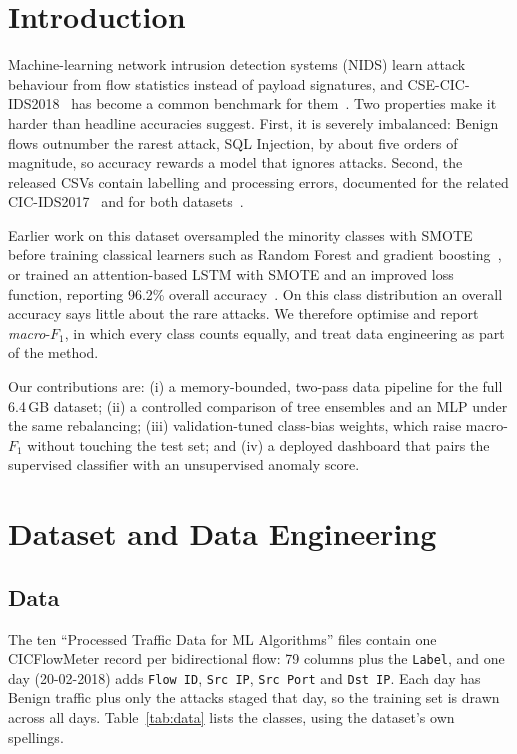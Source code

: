 \documentclass[conference]{IEEEtran}
\begin{document}
\section{Introduction}
Machine-learning network intrusion detection systems (NIDS) learn attack
behaviour from flow statistics instead of payload signatures, and
CSE-CIC-IDS2018~\cite{sharafaldin2018} has become a common benchmark for
them~\cite{leevy2020}. Two properties make it harder than headline accuracies
suggest. First, it is severely imbalanced: Benign flows outnumber the rarest
attack, SQL Injection, by about five orders of magnitude, so accuracy rewards a
model that ignores attacks. Second, the released CSVs contain labelling and
processing errors, documented for the related CIC-IDS2017~\cite{engelen2021}
and for both datasets~\cite{liu2022}.

Earlier work on this dataset oversampled the minority classes with SMOTE before
training classical learners such as Random Forest and gradient
boosting~\cite{karatas2020}, or trained an attention-based LSTM with SMOTE and an
improved loss function, reporting 96.2\% overall accuracy~\cite{lin2019}. On this
class distribution an overall accuracy says little about the rare attacks. We
therefore optimise and report \emph{macro}-$F_1$, in which every class counts
equally, and treat data engineering as part of the method.

Our contributions are: (i) a memory-bounded, two-pass data pipeline for the
full 6.4\,GB dataset; (ii) a controlled comparison of tree ensembles and an
MLP under the same rebalancing; (iii) validation-tuned class-bias weights,
which raise macro-$F_1$ without touching the test set; and (iv) a deployed
dashboard that pairs the supervised classifier with an unsupervised anomaly
score.

\section{Dataset and Data Engineering}
\subsection{Data}
The ten ``Processed Traffic Data for ML Algorithms'' files contain one
CICFlowMeter record per bidirectional flow: 79 columns plus the
\texttt{Label}, and one day (20-02-2018) adds \texttt{Flow ID},
\texttt{Src IP}, \texttt{Src Port} and \texttt{Dst IP}. Each day has Benign
traffic plus only the attacks staged that day, so the training set is drawn
across all days. Table~\ref{tab:data} lists the classes, using the dataset's
own spellings.
\end{document}
